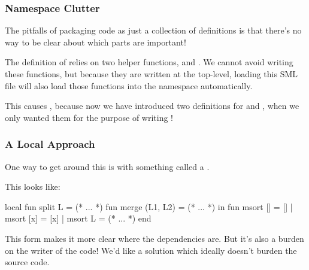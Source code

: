\documentclass[aspectratio=169, handout]{beamer}
\begin{document}
\begin{frame}[fragile]
  \frametitle{Namespace Clutter}

  The pitfalls of packaging code as just a collection of definitions is
  that there's no way to be clear about which parts are important!

  \pause
  \vspace{\fill}

  The definition of  relies on two helper functions, 
  and . We cannot avoid writing these functions, but because they
  are written at the top-level, loading this SML file will also load those
  functions into the namespace automatically.

  \pause
  \vspace{\fill}

  This causes , because now we have introduced two
  definitions for  and , when we only wanted them
  for the purpose of writing !
\end{frame}

\begin{frame}[fragile]
  \frametitle{A Local Approach}

  One way to get around this is with something called a .

  \pause
  \vspace{\fill}

  This looks like:

  \begin{codeblock}
    local
      fun split L = (* ... *)
      fun merge (L1, L2) = (* ... *)
    in
      fun msort [] = []
        | msort [x] = [x]
        | msort L = (* ... *)
    end
  \end{codeblock}

  \pause
  \vspace{\fill}

  This form makes it more clear where the dependencies are. But it's also a burden
  on the writer of the code! We'd like a solution which ideally doesn't burden
  the source code.
\end{frame}
\end{document}
